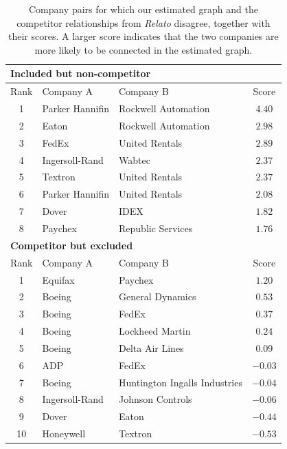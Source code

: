 \documentclass[11pt,a4paper,final]{article}
\numberwithin{equation}{section}
\theoremstyle{remark}
\begin{document}
\begin{table}[!t]
\caption{Company pairs for which our estimated graph and the competitor relationships from \textit{Relato} disagree, together with their scores. A larger score indicates that the two companies are more likely to be connected in the estimated graph.}
\centering
\small
\begin{tabular}{cllc}
\toprule
\multicolumn{4}{l}{\textbf{Included but non-competitor}} \\
\midrule
Rank & Company A & Company B & Score \\
\midrule
1 & Parker Hannifin & Rockwell Automation & $4.40$ \\
2 & Eaton & Rockwell Automation & $2.98$ \\
3 & FedEx & United Rentals & $2.89$ \\
4 & Ingersoll-Rand & Wabtec & $2.37$ \\
5 & Textron & United Rentals & $2.37$ \\
6 & Parker Hannifin & United Rentals & $2.08$ \\
7 & Dover & IDEX & $1.82$ \\
8 & Paychex & Republic Services & $1.76$ \\
\midrule
\multicolumn{4}{l}{\textbf{Competitor but excluded}} \\
\midrule
Rank & Company A & Company B & Score \\
\midrule
1 & Equifax & Paychex & $1.20$ \\
2 & Boeing & General Dynamics & $0.53$ \\
3 & Boeing & FedEx & $0.37$ \\
4 & Boeing & Lockheed Martin & $0.24$ \\
5 & Boeing & Delta Air Lines & $0.09$ \\
6 & ADP & FedEx & $-0.03$ \\
7 & Boeing & Huntington Ingalls Industries & $-0.04$ \\
8 & Ingersoll-Rand & Johnson Controls & $-0.06$ \\
9 & Dover & Eaton & $-0.44$ \\
10 & Honeywell & Textron & $-0.53$ \\
\bottomrule
\end{tabular}
\label{tab:competitor_mismatch}
\end{table}



% 
% 

% 
\end{document}
